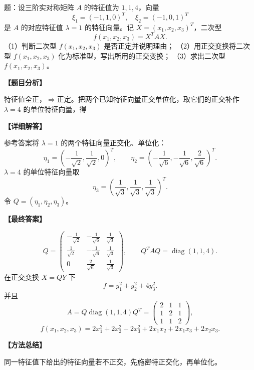 ﻿\documentclass[11pt,a4paper,UTF8]{ctexart}
\begin{document}
\begin{answerbox}
题：设三阶实对称矩阵 $A$ 的特征值为 $1,1,4$，向量
\[
\xi_1=(-1,1,0)^T,\quad \xi_2=(-1,0,1)^T
\]
是 $A$ 的对应特征值 $\lambda=1$ 的特征向量。记 $X=(x_1,x_2,x_3)^T$，二次型
\[
f(x_1,x_2,x_3)=X^TAX.
\]
（1）判断二次型 $f(x_1,x_2,x_3)$ 是否正定并说明理由；
（2）用正交变换将二次型 $f(x_1,x_2,x_3)$ 化为标准型，写出所用的正交变换；
（3）求出二次型 $f(x_1,x_2,x_3)$。

\textbf{【题目分析】}

特征值全正，$\Rightarrow$正定。把两个已知特征向量正交单位化，取它们的正交补作 $\lambda=4$ 的单位特征向量，得

\textbf{【详细解答】}

参考答案将 \(\lambda=1\) 的两个特征向量正交化、单位化：
\[
\eta_1=\left(-\frac1{\sqrt2},\frac1{\sqrt2},0\right)^T,\qquad
\eta_2=\left(-\frac1{\sqrt6},-\frac1{\sqrt6},\frac2{\sqrt6}\right)^T.
\]
\(\lambda=4\) 的单位特征向量取
\[
\eta_3=\left(\frac1{\sqrt3},\frac1{\sqrt3},\frac1{\sqrt3}\right)^T.
\]
令 \(Q=(\eta_1,\eta_2,\eta_3)\)。

\textbf{【最终答案】}

\[
Q=
\begin{pmatrix}
-\frac1{\sqrt2}&-\frac1{\sqrt6}&\frac1{\sqrt3}\\
\frac1{\sqrt2}&-\frac1{\sqrt6}&\frac1{\sqrt3}\\
0&\frac2{\sqrt6}&\frac1{\sqrt3}
\end{pmatrix},
\qquad
Q^TAQ=\operatorname{diag}(1,1,4).
\]
在正交变换 \(X=QY\) 下
\[
f=y_1^2+y_2^2+4y_3^2.
\]
并且
\[
A=Q\operatorname{diag}(1,1,4)Q^T=
\begin{pmatrix}
2&1&1\\
1&2&1\\
1&1&2
\end{pmatrix},
\]
\[
f(x_1,x_2,x_3)=2x_1^2+2x_2^2+2x_3^2+2x_1x_2+2x_1x_3+2x_2x_3.
\]

\textbf{【方法总结】}

同一特征值下给出的特征向量若不正交，先施密特正交化，再单位化。
\end{answerbox}
\end{document}
